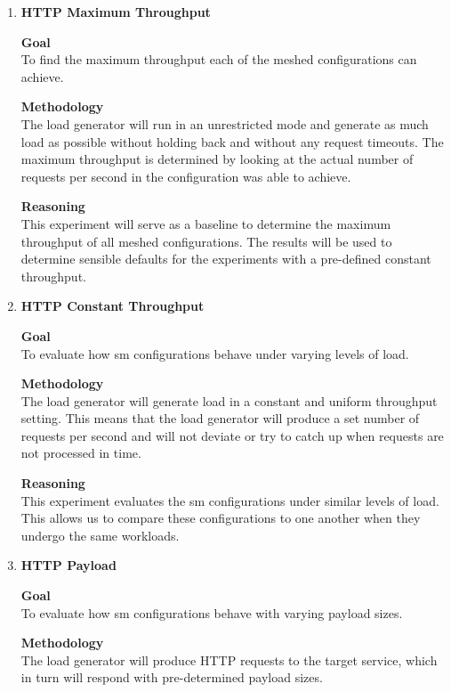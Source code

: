 \begin{enumerate}[label=\textbf{EXP\arabic*}, leftmargin=3\parindent]
    \item \textbf{HTTP Maximum Throughput}
    \label{exp:design:1}
    
    \textbf{Goal} \\
    To find the maximum throughput each of the meshed configurations can achieve.
    
    \textbf{Methodology} \\
    The load generator will run in an unrestricted mode and generate as much load as possible without holding back and without any request timeouts. The maximum throughput is determined by looking at the actual number of requests per second in the configuration was able to achieve.
    
    \textbf{Reasoning} \\
    This experiment will serve as a baseline to determine the maximum throughput of all meshed configurations. The results will be used to determine sensible defaults for the experiments with a pre-defined constant throughput.

    \item \textbf{HTTP Constant Throughput}
    \label{exp:design:2}
    
    \textbf{Goal} \\
    To evaluate how \gls{sm} configurations behave under varying levels of load.
        
    \textbf{Methodology} \\
    The load generator will generate load in a constant and uniform throughput setting. This means that the load generator will produce a set number of requests per second and will not deviate or try to catch up when requests are not processed in time.
    
    \textbf{Reasoning} \\
    This experiment evaluates the \gls{sm} configurations under similar levels of load. This allows us to compare these configurations to one another when they undergo the same workloads.
    
    \item \textbf{HTTP Payload}
    \label{exp:design:3}
    
    \textbf{Goal} \\
    To evaluate how \gls{sm} configurations behave with varying payload sizes.

    \textbf{Methodology} \\
    The load generator will produce HTTP requests to the target service, which in turn will respond with pre-determined payload sizes.


\end{enumerate}
